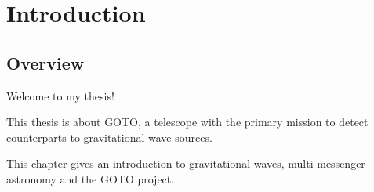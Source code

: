 \chapter{Introduction}
\label{chap:intro}
\chaptoc{}


\newpage
\section{Overview}
\label{sec:overview}
\begin{colsection}

Welcome to my thesis!

This thesis is about GOTO, a telescope with the primary mission to detect counterparts to gravitational wave sources.

This chapter gives an introduction to gravitational waves, multi-messenger astronomy and the GOTO project.

\end{colsection}


\newpage
